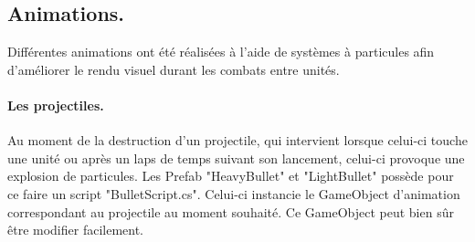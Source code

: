 \documentclass{report}
\begin{document}
\subsection{Animations.}
Différentes animations ont été réalisées à l'aide de systèmes à particules afin d'améliorer le rendu visuel durant les combats entre unités.
\paragraph{Les projectiles.}
Au moment de la destruction d'un projectile, qui intervient lorsque celui-ci touche une unité ou après un laps de temps suivant son lancement, celui-ci provoque une explosion de particules. Les Prefab "HeavyBullet" et "LightBullet" possède pour ce faire un script "BulletScript.cs". Celui-ci instancie le GameObject d'animation correspondant au projectile au moment souhaité. Ce GameObject peut bien sûr être modifier facilement.
\end{document}
